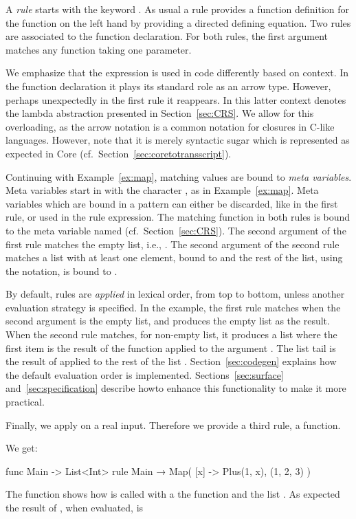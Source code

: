 A \emph{rule} starts with the keyword .  As usual a rule
provides a function definition for the function on the left hand by
providing a directed defining equation.
%
Two rules are associated to the  function
declaration.  For both rules, the first argument 
matches any function taking one parameter.

We emphasize that the expression  is used
in \Tosca code differently based on context. 
In the function declaration it plays its standard role as an arrow type. 
However, perhaps unexpectedly in the first rule it reappears. In this
latter context  denotes the lambda abstraction
 presented in Section~\ref{sec:CRS}. 
%
We allow for this overloading, as the arrow notation is a common
notation for closures in C-like languages. However, note that it is
merely syntactic sugar which is represented as expected in
\Tosca Core (cf.~Section~\ref{sec:coretotransscript}).

Continuing with Example~\ref{ex:map}, matching values are bound to
\emph{meta variables}.  Meta variables start in \Tosca with the
character \ToscaIn{#}, as  in
Example~\ref{ex:map}.  Meta variables which are bound in a pattern can
either be discarded, like in the first rule, or used in the rule
expression. The matching function in both rules is bound to the meta
variable named  (cf.~Section~\ref{sec:CRS}).
%
The second argument of the first rule matches the empty list, i.e.,
\ToscaIn{()}.  The second argument of the second rule matches a
list with at least one element, bound to  and the
rest of the list, using the  notation, is bound to
.

By default, rules are \emph{applied} in lexical order, from top to
bottom, unless another evaluation strategy is specified.  In the
example, the first rule matches when the second argument is the empty
list, and produces the empty list as the result.  When the second rule
matches, for non-empty list, it produces a list where the first item
is the result of the function  applied to the
argument .  The list tail is the result of
 applied to the rest of the list
. Section~\ref{sec:codegen} explains how the
default evaluation order is implemented. Sections~\ref{sec:surface}
and~\ref{sec:specification} describe howto enhance this functionality
to make it more practical.

Finally, we apply  on a real input. Therefore we  provide a third
  rule, a  function.
%
\begin{example}
\label{ex:map:2}
  We get:
  \begin{lstTosca}
func Main -> List<Int>
rule Main 
  → Map( [x] -> Plus(1, x), (1, 2, 3) )
  \end{lstTosca}
\end{example}
%
The function  shows how  is
called with a the function  and the list
.  As expected the result of
, when evaluated, is 

